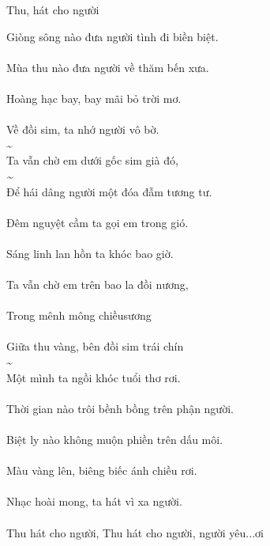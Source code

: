 \documentclass[14pt,a4paper]{extarticle}
\begin{document}
\newpage 
\small

Thu, hát cho người  \bigskip 

{\Huge \thu {} \cho  {}} \bigskip 

  
Giòng sông nào đưa người tình đi biền biệt.\\[1ex]
{\Huge{}}\\[1ex]
Mùa thu nào đưa người về thăm bến xưa.\\[1ex]
{\Huge{}\thu{}}\\[1ex]
Hoàng hạc bay, bay mãi bỏ trời mơ.\\[1ex]
{\Huge{}\bay\bay{}}\\[1ex]
Về đồi sim, ta nhớ người vô bờ.\\[1ex]
{\Huge {}  \sim \ta {}   }\\[1ex]
Ta vẫn chờ em dưới gốc sim già đó,\\[1ex]
{\Huge\ta{}\em{}\sim{}}\\[1ex]
Để hái dâng người một đóa đẫm tương tư.\\[1ex]
{\Huge{}}\\[1ex]
Đêm nguyệt cầm ta gọi em trong gió.\\[1ex]
{\Huge{}\ta{}\em\trong{}}\\[1ex]
Sáng linh lan hồn ta khóc bao giờ.\\[1ex]
{\Huge{}\linh\lan{}\ta{}\bao{}}\\[1ex]
Ta vẫn chờ em trên bao la đồi nương,\\[1ex]
{\Huge \ta{}  \em {} \bao \la {} }\\[1ex]
Trong mênh mông chiềusương\\[1ex]
{\Huge\Trong{}}\\[1ex]\newpage
Giữa thu vàng, bên đồi sim trái chín\\[1ex]
{\Huge{}\thu{}\sim{}}\\[1ex]
Một mình ta ngồi khóc tuổi thơ rơi.\\[1ex]
{\Huge{}\ta{}}\\[1ex]
Thời gian nào trôi bềnh bồng trên phận người.\\[1ex]
{\Huge{}\gian{}}\\[1ex]
Biệt ly nào không muộn phiền trên dấu môi.\\[1ex]
{\Huge{}\ly{}}\\[1ex]
Màu vàng lên, biêng biếc ánh chiều rơi.\\[1ex]
{\Huge{}}\\[1ex]
Nhạc hoài mong, ta hát vì xa người.\\[1ex]
{\Huge{}\mong\ta{}\xa{}}\\[1ex]
Thu hát cho người, Thu hát cho người, người yêu...ơi\\[1ex]
{\Huge\thu{}\cho{} \thu{}\cho{}  }\\[1ex]
\end{document}
